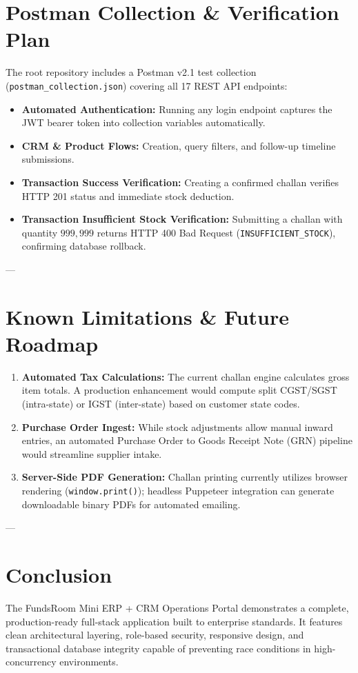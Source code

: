 \documentclass[11pt,a4paper]{article}
\begin{document}
\section{Postman Collection \& Verification Plan}
The root repository includes a Postman v2.1 test collection (\texttt{postman\_collection.json}) covering all 17 REST API endpoints:
\begin{itemize}[itemsep=0.3em]
    \item \textbf{Automated Authentication:} Running any login endpoint captures the JWT bearer token into collection variables automatically.
    \item \textbf{CRM \& Product Flows:} Creation, query filters, and follow-up timeline submissions.
    \item \textbf{Transaction Success Verification:} Creating a confirmed challan verifies HTTP 201 status and immediate stock deduction.
    \item \textbf{Transaction Insufficient Stock Verification:} Submitting a challan with quantity $999{,}999$ returns HTTP 400 Bad Request (\texttt{INSUFFICIENT\_STOCK}), confirming database rollback.
\end{itemize}

---

\section{Known Limitations \& Future Roadmap}
\begin{enumerate}[itemsep=0.3em]
    \item \textbf{Automated Tax Calculations:} The current challan engine calculates gross item totals. A production enhancement would compute split CGST/SGST (intra-state) or IGST (inter-state) based on customer state codes.
    \item \textbf{Purchase Order Ingest:} While stock adjustments allow manual inward entries, an automated Purchase Order to Goods Receipt Note (GRN) pipeline would streamline supplier intake.
    \item \textbf{Server-Side PDF Generation:} Challan printing currently utilizes browser rendering (\texttt{window.print()}); headless Puppeteer integration can generate downloadable binary PDFs for automated emailing.
\end{enumerate}

---

\section{Conclusion}
The FundsRoom Mini ERP + CRM Operations Portal demonstrates a complete, production-ready full-stack application built to enterprise standards. It features clean architectural layering, role-based security, responsive design, and transactional database integrity capable of preventing race conditions in high-concurrency environments.
\end{document}
